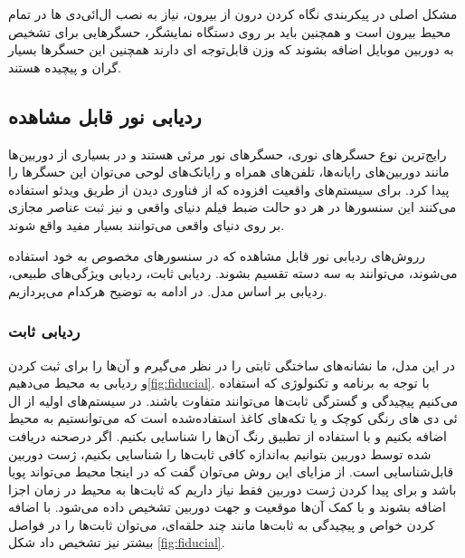 مشکل اصلی در پیکربندی نگاه کردن درون از بیرون، نیاز به نصب ال‌ائی‌دی ها در تمام محیط بیرون است و همچنین باید بر روی دستگاه نمایشگر، حسگرهایی برای تشخیص به دوربین موبایل اضافه بشوند که وزن قابل‌توجه ای دارند همچنین این حسگرها بسیار گران و پیچیده هستند.

\subsection{ردیابی نور قابل مشاهده}

رایج‌ترین نوع حسگرهای نوری، حسگرهای نور مرئی هستند و در بسیاری از دوربین‌ها مانند دوربین‌های رایانه‌ها، تلفن‌های همراه و رایانک‌های لوحی می‌توان این حسگرها را پیدا کرد. برای سیستم‌های واقعیت افزوده که از فناوری دیدن از طریق ویدئو استفاده می‌کنند این سنسورها در هر دو حالت ضبط فیلم دنیای واقعی و نیز ثبت عناصر مجازی بر روی دنیای واقعی می‌توانند بسیار مفید واقع شوند.

رروش‌های ردیابی نور قابل مشاهده که در سنسورهای مخصوص به خود استفاده می‌شوند، می‌توانند به سه دسته تقسیم بشوند. ردیابی ثابت، ردیابی ویژگی‌های طبیعی، ردیابی بر اساس مدل. در ادامه به توضیح هرکدام می‌پردازیم.

	\subsubsection{ردیابی ثابت}
	
در این مدل، ما نشانه‌های ساختگی ثابتی را در نظر می‌گیرم و آن‌ها را  برای ثبت کردن و ردیابی به محیط می‌دهیم\ref{fig:fiducial}. با توجه به برنامه و تکنولوژی که استفاده می‌کنیم پیچیدگی و گسترگی ثابت‌ها می‌توانند متفاوت باشند. در سیستم‌های اولیه از ال ئی دی های رنگی کوچک و یا تکه‌های کاغذ استفاده‌شده است که می‌توانستیم به محیط اضافه بکنیم و با استفاده از تطبیق رنگ آن‌ها را شناسایی بکنیم. اگر درصحنه دریافت شده توسط دوربین بتوانیم به‌اندازه کافی ثابت‌ها را شناسایی بکنیم، ژست دوربین قابل‌شناسایی است. از مزایای این روش می‌توان گفت که در اینجا محیط می‌تواند پویا باشد و برای پیدا کردن ژست دوربین فقط نیاز داریم که ثابت‌ها به محیط در زمان اجزا اضافه بشوند و با کمک آن‌ها موقعیت و جهت دوربین تشخیص داده می‌شود. با اضافه کردن خواص و پیچیدگی به ثابت‌ها مانند چند حلقه‌ای، می‌توان ثابت‌ها را در فواصل بیشتر نیز تشخیص داد شکل \ref{fig:fiducial}\cite{basiratzadeh2019fiducial}.
	
